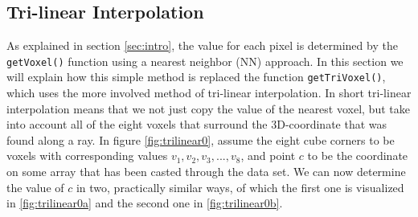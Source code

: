 \subsection{Tri-linear Interpolation}\label{subsec:tri_linear}
As explained in section \ref{sec:intro}, the value for each pixel is determined by the \texttt{getVoxel()} function using a nearest neighbor (NN) approach. In this section we will explain how this simple method is replaced the function \texttt{getTriVoxel()}, which uses the more involved method of tri-linear interpolation. In short tri-linear interpolation means that we not just copy the value of the nearest voxel, but take into account all of the eight voxels that surround the 3D-coordinate that was found along a ray. In figure \ref{fig:trilinear0}, assume the eight cube corners to be voxels with corresponding values $v_1, v_2, v_3, ..., v_8$, and point $c$ to be the coordinate on some array that has been casted through the data set. We can now determine the value of $c$ in two, practically similar ways, of which the first one is visualized in \ref{fig:trilinear0a} and the second one in \ref{fig:trilinear0b}.


